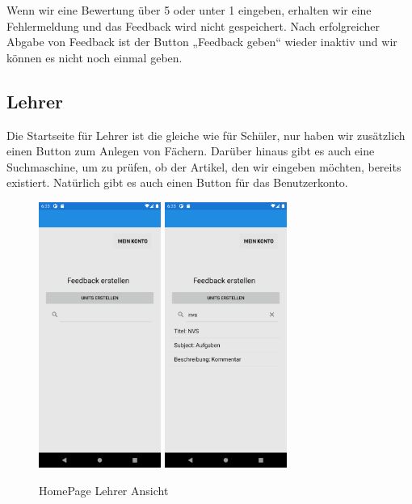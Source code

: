 \newline
Wenn wir eine Bewertung über 5 oder unter 1 eingeben, erhalten wir eine Fehlermeldung und das Feedback wird nicht gespeichert.
Nach erfolgreicher Abgabe von Feedback ist der Button „Feedback geben“ wieder inaktiv und wir können es nicht noch einmal geben.
\newpage

\subsection{Lehrer}
Die Startseite für Lehrer ist die gleiche wie für Schüler, nur haben wir zusätzlich einen Button zum Anlegen von Fächern. Darüber hinaus gibt es auch eine Suchmaschine, um zu prüfen, ob der Artikel, den wir eingeben möchten, bereits existiert. Natürlich gibt es auch einen Button für das Benutzerkonto.
\begin{figure}[h]
    \begin{center}
        \includegraphics[width=4cm]{pics/Xamarin Lehrer/2 HomePage Lehrer.png}\hfill
        \includegraphics[width=4cm]{pics/Xamarin Lehrer/3 Unit finden.png}
        \caption[HomePage Lehrer Ansicht]{HomePage Lehrer Ansicht}
    \end{center}
\end{figure}
